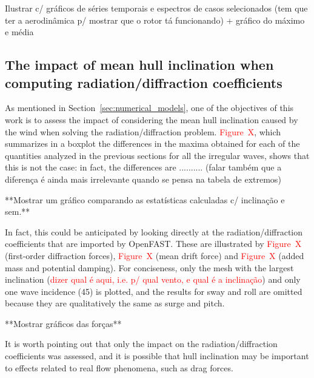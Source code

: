 Ilustrar c/ gráficos de séries temporais e espectros de casos selecionados (tem que ter a aerodinâmica p/ mostrar que o rotor tá funcionando) + gráfico do máximo e média


\subsection{The impact of mean hull inclination when computing radiation/diffraction coefficients} \label{subsec:impact_inclination}
As mentioned in Section~\ref{sec:numerical_models}, one of the objectives of this work is to assess the impact of considering the mean hull inclination caused by the wind when solving the radiation/diffraction problem. \textcolor{red}{Figure~X}, which summarizes in a boxplot the differences in the maxima obtained for each of the quantities analyzed in the previous sections for all the irregular waves, shows that this is not the case: in fact, the differences are .......... (falar também que a diferença é ainda mais irrelevante quando se pensa na tabela de extremos)

**Mostrar um gráfico comparando as estatísticas calculadas c/ inclinação e sem.**

In fact, this could be anticipated by looking directly at the radiation/diffraction coefficients that are imported by OpenFAST. These are illustrated by \textcolor{red}{Figure~X} (first-order diffraction forces), \textcolor{red}{Figure~X} (mean drift force) and \textcolor{red}{Figure~X} (added mass and potential damping). For conciseness, only the mesh with the largest inclination (\textcolor{red}{dizer qual é aqui, i.e. p/ qual vento, e qual é a inclinação}) and only one wave incidence (45\textdegree{}) is plotted, and the results for sway and roll are omitted because they are qualitatively the same as surge and pitch.

**Mostrar gráficos das forças**

It is worth pointing out that only the impact on the radiation/diffraction coefficients was assessed, and it is possible that hull inclination may be important to effects related to real flow phenomena, such as drag forces.